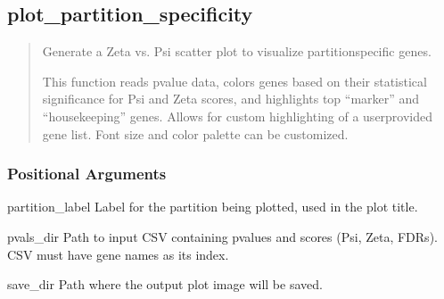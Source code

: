 \documentclass[letterpaper,10pt,english]{sphinxmanual}
\begin{document}
\subsection{plot\_partition\_specificity}
\label{\detokenize{cli:plot_partition_specificity}}\begin{quote}

\sphinxAtStartPar
Generate a Zeta vs. Psi scatter plot to visualize partition\sphinxhyphen{}specific genes.

\sphinxAtStartPar
This function reads p\sphinxhyphen{}value data, colors genes based on their statistical
significance for Psi and Zeta scores, and highlights top “marker” and
“housekeeping” genes. Allows for custom highlighting of a user\sphinxhyphen{}provided
gene list. Font size and color palette can be customized.
\end{quote}

\begin{sphinxVerbatim}[commandchars=\\\{\}]
  \PYG{p}{[}\PYG{p}{]} \PYG{p}{[}  \PYG{p}{[} \PYG{p}{]}\PYG{p}{]} \PYG{p}{[} \PYG{p}{]}
                                 \PYG{p}{[} \PYG{p}{]} \PYG{p}{[}  \PYG{p}{[} \PYG{p}{]}\PYG{p}{]}
                                   
\end{sphinxVerbatim}


\subsubsection{Positional Arguments}
\label{\detokenize{cli:positional-arguments_repeat2}}\begin{optionlist}{3cm}
\item [partition\_label]  
\sphinxAtStartPar
Label for the partition being plotted, used in the plot title.
\item [pvals\_dir]  
\sphinxAtStartPar
Path to input CSV containing p\sphinxhyphen{}values and scores (Psi, Zeta, FDRs). CSV must have gene names as its index.
\item [save\_dir]  
\sphinxAtStartPar
Path where the output plot image will be saved.
\end{optionlist}
\end{document}
